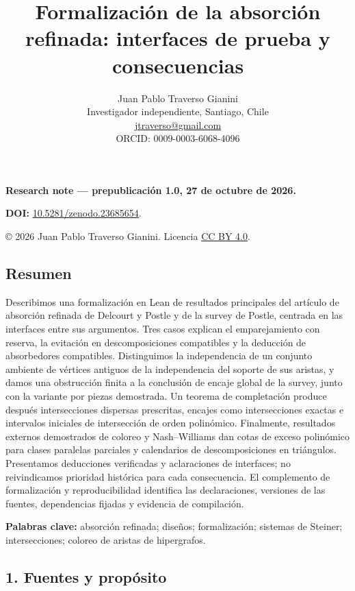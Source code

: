 \documentclass[spanish,11pt,a4paper]{article}
\title{Formalización de la absorción refinada: interfaces de prueba y consecuencias}
\author{Juan Pablo Traverso Gianini\\
\small Investigador independiente, Santiago, Chile\\
\small \href{mailto:jtraverso@gmail.com}{jtraverso@gmail.com}\\
\small ORCID: 0009-0003-6068-4096}
\date{}
\begin{document}
\raggedbottom
{}
\makeatletter
{}
\makeatother
\maketitle
\textbf{Research note --- prepublicación 1.0, 27 de octubre de 2026.}

\textbf{DOI:} \href{https://doi.org/10.5281/zenodo.23685654}{10.5281/zenodo.23685654}.

© 2026 Juan Pablo Traverso Gianini. Licencia \href{https://creativecommons.org/licenses/by/4.0/}{CC BY 4.0}.

\subsection{Resumen}\label{resumen}

Describimos una formalización en Lean de resultados principales del artículo de absorción refinada de Delcourt y Postle y de la survey de Postle, centrada en las interfaces entre sus argumentos. Tres casos explican el emparejamiento con reserva, la evitación en descomposiciones compatibles y la deducción de absorbedores compatibles. Distinguimos la independencia de un conjunto ambiente de vértices antiguos de la independencia del soporte de sus aristas, y damos una obstrucción finita a la conclusión de encaje global de la survey, junto con la variante por piezas demostrada. Un teorema de completación produce después intersecciones dispersas prescritas, encajes como intersecciones exactas e intervalos iniciales de intersección de orden polinómico. Finalmente, resultados externos demostrados de coloreo y Nash--Williams dan cotas de exceso polinómico para clases paralelas parciales y calendarios de descomposiciones en triángulos. Presentamos deducciones verificadas y aclaraciones de interfaces; no reivindicamos prioridad histórica para cada consecuencia. El complemento de formalización y reproducibilidad identifica las declaraciones, versiones de las fuentes, dependencias fijadas y evidencia de compilación.

\textbf{Palabras clave:} absorción refinada; diseños; formalización; sistemas de Steiner; intersecciones; coloreo de aristas de hipergrafos.

\subsection{1. Fuentes y propósito}\label{fuentes-y-propuxf3sito}
\end{document}
